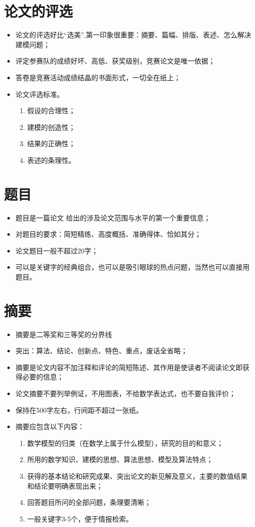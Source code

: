 \documentclass[openany]{progbookcn}
\begin{document}
\section{论文的评选}
\begin{itemize}
    \item 论文的评选好比“选美”,第一印象很重要：摘要、篇幅、排版、表述、怎么解决建模问题；
    \item 评定参赛队的成绩好坏、高低、获奖级别，竞赛论文是唯一依据；
    \item 答卷是竞赛活动成绩结晶的书面形式，一切全在纸上；
    \item 论文评选标准。 
    \begin{enumerate}[itemindent=1em]
        \item 假设的合理性；
        \item 建模的创造性；
        \item 结果的正确性；
        \item 表述的条理性。
    \end{enumerate}
\end{itemize}
\section{题目}
\begin{itemize}
    \item 题目是一篇论文 给出的涉及论文范围与水平的第一个重要信息；
    \item 对题目的要求：简短精练、高度概括、准确得体、恰如其分；
    \item 论文题目一般不超过20字；
    \item 可以是关键字的经典组合，也可以是吸引眼球的热点问题，当然也可以直接用题目。
\end{itemize}
\section{摘要}
\begin{itemize}
    \item 摘要是二等奖和三等奖的分界线
    \item 突出：算法、结论、创新点、特色、重点，废话全省略；
    \item 摘要是论文内容不加注释和评论的简短陈述、其作用是使读者不阅读论文即获得必要的信息；
    \item 论文摘要不要列举例证，不用图表，不给数学表达式，也不要自我评价；
    \item 保持在500字左右，行间距不超过一张纸。
    \item 摘要应包含以下内容：
    \begin{enumerate}[itemindent=1em]
        \item 数学模型的归类（在数学上属于什么模型），研究的目的和意义；
        \item 所用的数学知识、建模的思想、算法思想、模型及算法特点；
        \item 获得的基本结论和研究成果、突出论文的新见解及意义，主要的数值结果和结论要明确表现出来；
        \item 回答题目所问的全部问题，条理要清晰；
        \item 一般关键字3-5个，便于情报检索。
    \end{enumerate}
\end{itemize}
\end{document}
